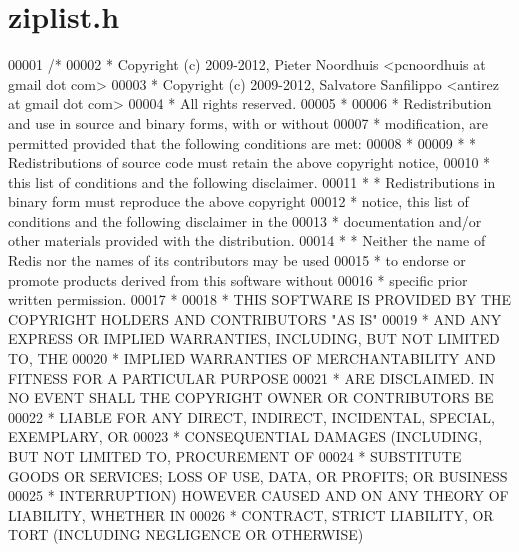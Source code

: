 \hypertarget{ziplist_8h_source}{}\section{ziplist.\+h}
\label{ziplist_8h_source}

\begin{DoxyCode}
00001 \textcolor{comment}{/*}
00002 \textcolor{comment}{ * Copyright (c) 2009-2012, Pieter Noordhuis <pcnoordhuis at gmail dot com>}
00003 \textcolor{comment}{ * Copyright (c) 2009-2012, Salvatore Sanfilippo <antirez at gmail dot com>}
00004 \textcolor{comment}{ * All rights reserved.}
00005 \textcolor{comment}{ *}
00006 \textcolor{comment}{ * Redistribution and use in source and binary forms, with or without}
00007 \textcolor{comment}{ * modification, are permitted provided that the following conditions are met:}
00008 \textcolor{comment}{ *}
00009 \textcolor{comment}{ *   * Redistributions of source code must retain the above copyright notice,}
00010 \textcolor{comment}{ *     this list of conditions and the following disclaimer.}
00011 \textcolor{comment}{ *   * Redistributions in binary form must reproduce the above copyright}
00012 \textcolor{comment}{ *     notice, this list of conditions and the following disclaimer in the}
00013 \textcolor{comment}{ *     documentation and/or other materials provided with the distribution.}
00014 \textcolor{comment}{ *   * Neither the name of Redis nor the names of its contributors may be used}
00015 \textcolor{comment}{ *     to endorse or promote products derived from this software without}
00016 \textcolor{comment}{ *     specific prior written permission.}
00017 \textcolor{comment}{ *}
00018 \textcolor{comment}{ * THIS SOFTWARE IS PROVIDED BY THE COPYRIGHT HOLDERS AND CONTRIBUTORS "AS IS"}
00019 \textcolor{comment}{ * AND ANY EXPRESS OR IMPLIED WARRANTIES, INCLUDING, BUT NOT LIMITED TO, THE}
00020 \textcolor{comment}{ * IMPLIED WARRANTIES OF MERCHANTABILITY AND FITNESS FOR A PARTICULAR PURPOSE}
00021 \textcolor{comment}{ * ARE DISCLAIMED. IN NO EVENT SHALL THE COPYRIGHT OWNER OR CONTRIBUTORS BE}
00022 \textcolor{comment}{ * LIABLE FOR ANY DIRECT, INDIRECT, INCIDENTAL, SPECIAL, EXEMPLARY, OR}
00023 \textcolor{comment}{ * CONSEQUENTIAL DAMAGES (INCLUDING, BUT NOT LIMITED TO, PROCUREMENT OF}
00024 \textcolor{comment}{ * SUBSTITUTE GOODS OR SERVICES; LOSS OF USE, DATA, OR PROFITS; OR BUSINESS}
00025 \textcolor{comment}{ * INTERRUPTION) HOWEVER CAUSED AND ON ANY THEORY OF LIABILITY, WHETHER IN}
00026 \textcolor{comment}{ * CONTRACT, STRICT LIABILITY, OR TORT (INCLUDING NEGLIGENCE OR OTHERWISE)}

\end{DoxyCode}
